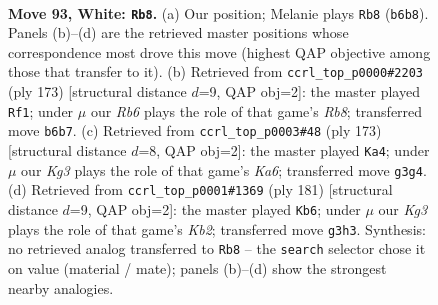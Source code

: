 \documentclass[11pt]{article}
\begin{document}
\clearpage

\begin{figure}[p]\centering
\begin{subfigure}{0.46\textwidth}\centering
\resizebox{\linewidth}{!}{%
\newchessgame
\chessboard[
  setfen={5rk1/P7/1R6/8/8/6K1/8/8 w - - 55 93},
  showmover=false,
  pgfstyle=straightmove, color=movearrow, markmove={b6-b8}
]}
\caption{}
\end{subfigure}\hfill
\begin{subfigure}{0.46\textwidth}\centering
\resizebox{\linewidth}{!}{%
\newchessgame
\chessboard[
  setfen={8/5k2/8/7P/5P2/6RK/8/1r6 b - - 4 87},
  showmover=false,
  pgfstyle=straightmove, color=movearrow, markmove={b1-f1}
]}
\caption{}
\end{subfigure}
\\[4pt]
\begin{subfigure}{0.46\textwidth}\centering
\resizebox{\linewidth}{!}{%
\newchessgame
\chessboard[
  setfen={8/8/KR6/8/8/k7/8/8 b - - 8 87},
  showmover=false,
  pgfstyle=straightmove, color=movearrow, markmove={a3-a4}
]}
\caption{}
\end{subfigure}\hfill
\begin{subfigure}{0.46\textwidth}\centering
\resizebox{\linewidth}{!}{%
\newchessgame
\chessboard[
  setfen={8/1k6/8/2R5/2K5/8/8/8 b - - 15 91},
  showmover=false,
  pgfstyle=straightmove, color=movearrow, markmove={b7-b6}
]}
\caption{}
\end{subfigure}
\caption{\textbf{Move 93, White: \texttt{Rb8}.} (a) Our position; Melanie plays \texttt{Rb8} (\texttt{b6b8}). Panels (b)--(d) are the retrieved master positions whose correspondence most drove this move (highest QAP objective among those that transfer to it). (b) Retrieved from \texttt{ccrl\_top\_p0000\#2203} (ply 173) [structural distance $d$=9, QAP obj=2]: the master played \texttt{Rf1}; under $\mu$ our \emph{Rb6} plays the role of that game's \emph{Rb8}; transferred move \texttt{b6b7}. (c) Retrieved from \texttt{ccrl\_top\_p0003\#48} (ply 173) [structural distance $d$=8, QAP obj=2]: the master played \texttt{Ka4}; under $\mu$ our \emph{Kg3} plays the role of that game's \emph{Ka6}; transferred move \texttt{g3g4}. (d) Retrieved from \texttt{ccrl\_top\_p0001\#1369} (ply 181) [structural distance $d$=9, QAP obj=2]: the master played \texttt{Kb6}; under $\mu$ our \emph{Kg3} plays the role of that game's \emph{Kb2}; transferred move \texttt{g3h3}. Synthesis: no retrieved analog transferred to \texttt{Rb8} -- the \texttt{search} selector chose it on value (material / mate); panels (b)--(d) show the strongest nearby analogies.}
\label{fig:thought-m184}
\end{figure}
\end{document}
